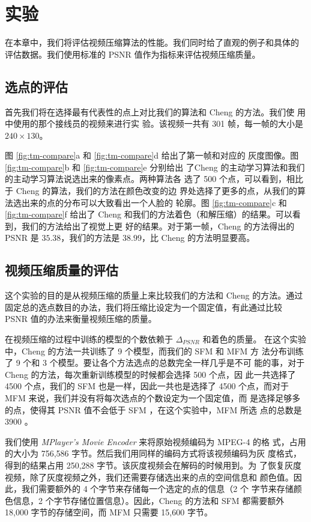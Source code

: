 \chapter{实验}

在本章中，我们将评估视频压缩算法的性能。我们同时给了直观的例子和具体的
评估数据。我们使用标准的 PSNR 值作为指标来评估视频压缩质量。

\section{选点的评估}

首先我们将在选择最有代表性的点上对比我们的算法和 Cheng 的方法。我们使
用 \cite{learning-to-compress-images} 中使用的那个接线员的视频来进行实
验。该视频一共有 301 帧，每一帧的大小是 $240 \times 130$。

图 \ref{fig:tm-compare}a 和 \ref{fig:tm-compare}d 给出了第一帧和对应的
灰度图像。图 \ref{fig:tm-compare}b 和 \ref{fig:tm-compare}e 分别给出
了Cheng 的主动学习算法和我们的主动学习算法说选出来的像素点。两种算法各
选了 500 个点，可以看到，相比于 Cheng 的算法，我们的方法在颜色改变的边
界处选择了更多的点，从我们的算法选出来的点的分布可以大致看出一个人脸的
轮廓。图 \ref{fig:tm-compare}c 和 \ref{fig:tm-compare}f 给出了 Cheng
和我们的方法着色（和解压缩）的结果。可以看到，我们的方法给出了视觉上更
好的结果。对于第一帧，Cheng 的方法得出的 PSNR 是 $35.38$，我们的方法是
$38.99$，比 Cheng 的方法明显要高。

\section{视频压缩质量的评估}

这个实验的目的是从视频压缩的质量上来比较我们的方法和 Cheng 的方法。通过
固定总的选点数目的办法，我们将压缩比设定为一个固定值，有此通过比较
PSNR 值的办法来衡量视频压缩的质量。

在视频压缩的过程中训练的模型的个数依赖于 $\Delta_{PSNR}$ 和着色的质量。
在这个实验中，Cheng 的方法一共训练了 9 个模型，而我们的 SFM 和 MFM 方
法分布训练了 9 个和 3 个模型。要让各个方法选点的总数完全一样几乎是不可
能的事，对于 Cheng 的方法，每次重新训练模型的时候都会选择 500 个点，因
此一共选择了 4500 个点，我们的 SFM 也是一样，因此一共也是选择了 4500
个点，而对于 MFM 来说，我们并没有将每次选点的个数设定为一个固定值，而
是选择足够多的点，使得其 PSNR 值不会低于 SFM ，在这个实验中，MFM 所选
点的总数是 3900 。

我们使用 {\em MPlayer's Movie Encoder} 来将原始视频编码为 MPEG-4 的格
式，占用的大小为 756,586 字节。然后我们用同样的编码方式将该视频编码为灰
度格式，得到的结果占用 250,288 字节。该灰度视频会在解码的时候用到。为
了恢复灰度视频，除了灰度视频之外，我们还需要存储选出来的点的空间信息和
颜色值。因此，我们需要额外的 4 个字节来存储每一个选定的点的信息（2 个
字节来存储颜色信息，2 个字节存储位置信息）。因此，Cheng 的方法和 SFM
都需要额外 18,000 字节的存储空间，而 MFM 只需要 15,600 字节。

